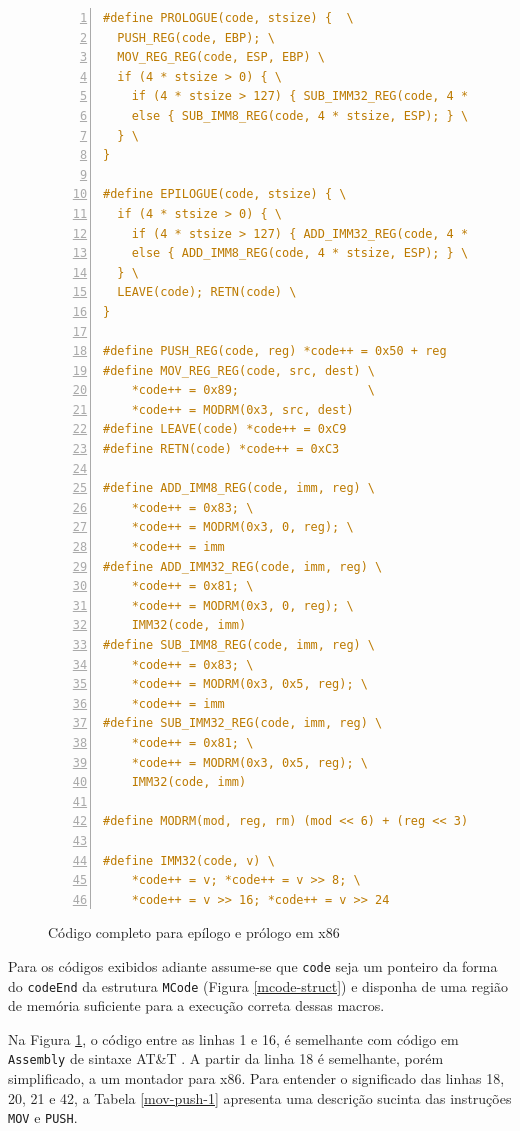 \begin{figure}[ht!]
  \centering
  \begin{lstlisting}[language=C, numbers=left]
#define PROLOGUE(code, stsize) {  \
  PUSH_REG(code, EBP); \
  MOV_REG_REG(code, ESP, EBP) \
  if (4 * stsize > 0) { \
    if (4 * stsize > 127) { SUB_IMM32_REG(code, 4 * stsize, ESP); } \
    else { SUB_IMM8_REG(code, 4 * stsize, ESP); } \
  } \
}

#define EPILOGUE(code, stsize) { \
  if (4 * stsize > 0) { \
    if (4 * stsize > 127) { ADD_IMM32_REG(code, 4 * stsize, ESP); } \
    else { ADD_IMM8_REG(code, 4 * stsize, ESP); } \
  } \
  LEAVE(code); RETN(code) \
}

#define PUSH_REG(code, reg) *code++ = 0x50 + reg
#define MOV_REG_REG(code, src, dest) \
    *code++ = 0x89;                  \
    *code++ = MODRM(0x3, src, dest)
#define LEAVE(code) *code++ = 0xC9
#define RETN(code) *code++ = 0xC3

#define ADD_IMM8_REG(code, imm, reg) \
    *code++ = 0x83; \
    *code++ = MODRM(0x3, 0, reg); \
    *code++ = imm
#define ADD_IMM32_REG(code, imm, reg) \
    *code++ = 0x81; \
    *code++ = MODRM(0x3, 0, reg); \
    IMM32(code, imm)
#define SUB_IMM8_REG(code, imm, reg) \
    *code++ = 0x83; \
    *code++ = MODRM(0x3, 0x5, reg); \
    *code++ = imm
#define SUB_IMM32_REG(code, imm, reg) \
    *code++ = 0x81; \
    *code++ = MODRM(0x3, 0x5, reg); \
    IMM32(code, imm)

#define MODRM(mod, reg, rm) (mod << 6) + (reg << 3) + rm

#define IMM32(code, v) \
    *code++ = v; *code++ = v >> 8; \
    *code++ = v >> 16; *code++ = v >> 24
  \end{lstlisting}
  \caption{Código completo para epílogo e prólogo em x86\label{prologo-epilogo}}
\end{figure}

Para os códigos exibidos adiante assume-se que \verb!code! seja um
ponteiro da forma do \verb!codeEnd!
da estrutura \verb!MCode! (Figura \ref{mcode-struct}) e disponha de
uma região de memória suficiente para a execução correta dessas macros.

Na Figura \ref{prologo-epilogo}, o código entre as linhas 1 e 16, é
semelhante com código em \texttt{Assembly} \cite{assembly1} de sintaxe
AT\&T \cite{sintaxeatt}. A partir da linha 18 é semelhante, porém
simplificado, a um montador para x86. Para entender o significado das
linhas 18, 20, 21 e 42, a Tabela \ref{mov-push-1} apresenta uma descrição
sucinta das instruções \verb!MOV! e \verb!PUSH!.

